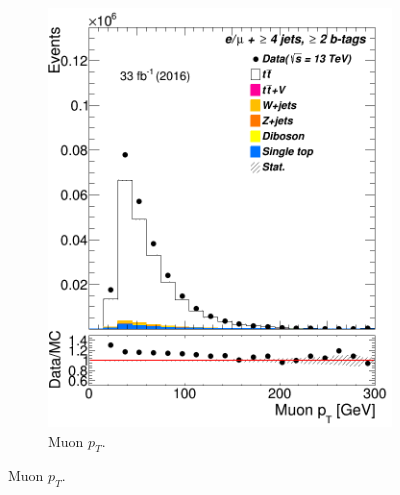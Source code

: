 \begin{figure}
\begin{subfigure}{0.25\textwidth}
		\includegraphics[width=\linewidth]{ControlPlots_emujets_2016_4incl_2incl/mu_pt_emujets_2016.png}
		\caption{Muon $p_T$.} \label{fig:Sec12}
	\end{subfigure}



\end{figure}
